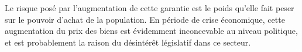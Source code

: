 
\smallbreak Le risque posé par l'augmentation de cette garantie est le poids qu'elle fait peser sur le pouvoir d'achat de la population.
En période de crise économique, cette augmentation du prix des biens est évidemment inconcevable au niveau politique, et est probablement la raison du désintérêt législatif dans ce secteur.
